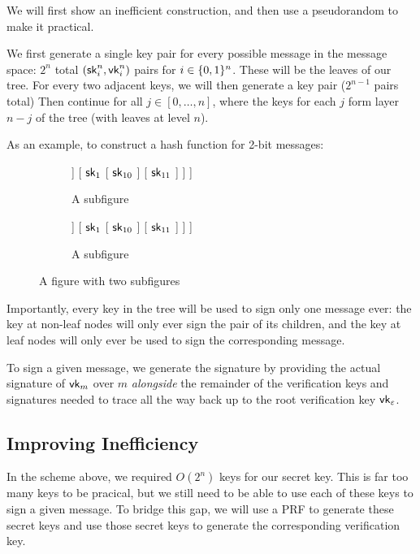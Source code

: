 We
will first show an inefficient construction, and
then use a pseudorandom to make it practical.

We first generate a single key pair for every possible message in the message space: $2^n$ total $({\mathsf{sk}}_i^n, \mathsf{vk}_i^n)$ pairs for $i \in \{0,1\}^n$. These will be the leaves of our tree. For every two adjacent keys, we will then generate a key pair ($2^{n-1}$ pairs total) Then continue for all $j \in [0, \ldots, n]$, where the keys for each $j$ form layer $n-j$ of the tree (with leaves at level $n$).


As an example, to construct a hash function for 2-bit messages:

\begin{figure}[htpb]
	\centering
	\begin{subfigure}{.5\textwidth}
		\centering
		\begin{forest}
			[$\sk_\varepsilon$
				[ $\sk_0 $ 
					[ $\sk_{00}$ ]
					[ $\sk_{01}$ ]
				]
				[ $ {\mathsf{sk}}_1 $ 
					[ ${\mathsf{sk}}_{10}$ ]
					[ ${\mathsf{sk}}_{11}$ ]
				]
			]
		\end{forest}
		\caption{A subfigure}
		\label{fig:sub1}
	\end{subfigure}%
	\begin{subfigure}{.5\textwidth}
		\centering
		\begin{forest}
			[$\sk_\varepsilon$
				[ $\sk_0 $ 
					[ $\sk_{00}$ ]
					[ $\sk_{01}$ ]
				]
				[ $ {\mathsf{sk}}_1 $ 
					[ ${\mathsf{sk}}_{10}$ ]
					[ ${\mathsf{sk}}_{11}$ ]
				]
			]
		\end{forest}
		\caption{A subfigure}
		\label{fig:sub2}
	\end{subfigure}
	\caption{A figure with two subfigures}
	\label{fig:test}
\end{figure}

Importantly, every key in the tree will be used to sign only one message ever: the key at non-leaf nodes will only ever sign the pair of its children, and the key at leaf nodes will only ever be used to sign the corresponding message. 

To sign a given message, we generate the signature by providing the actual signature of $\mathsf{vk}_m$ over $m$ \emph{alongside} the remainder of the verification keys and signatures needed to trace all the way back up to the root verification key $\mathsf{vk}_\varepsilon$.


\subsection{Improving Inefficiency}
In the scheme above, we required $O(2^n)$ keys for our secret key. This is far too many keys to be pracical, but we still need to be able to use each of these keys to sign a given message. To bridge this gap, we will use a PRF to generate these secret keys  and use those secret keys to generate the corresponding verification key.


